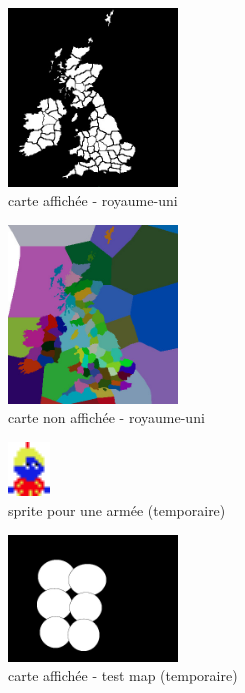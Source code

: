 \documentclass[a4paper,12pt]{article}
\begin{document}
\begin{figure}[hbtp]
\centering
\includegraphics[width=0.4\textwidth]{provincesShown.jpg}
\caption{carte affichée - royaume-uni} 
\end{figure}

\begin{figure}[hbtp]
\centering
\includegraphics[width=0.4\textwidth]{ru.jpg}
\caption{carte non affichée - royaume-uni} 
\end{figure}

\begin{figure}[hbtp]
\centering
\includegraphics[width=0.1\textwidth]{army.png}
\caption{sprite pour une armée (temporaire)} 
\end{figure}

\begin{figure}[hbtp]
\centering
\includegraphics[width=0.4\textwidth]{testMapShown.jpg}
\caption{carte affichée - test map (temporaire)} 
\end{figure}
\end{document}

